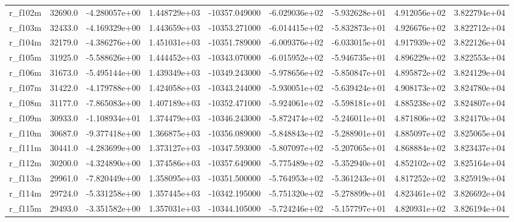 \documentclass[10pt]{article}
\begin{document}
\begin{landscape}
\begin{longtable}{lrrrrrrrr}
r\_f102m                 &   32690.0 & -4.280057e+00 &  1.448729e+03 & -10357.049000 & -6.029036e+02 & -5.932628e+01 &  4.912056e+02 &  3.822794e+04 \\
r\_f103m                 &   32433.0 & -4.169329e+00 &  1.443659e+03 & -10353.271000 & -6.014415e+02 & -5.832873e+01 &  4.926676e+02 &  3.822712e+04 \\
r\_f104m                 &   32179.0 & -4.386276e+00 &  1.451031e+03 & -10351.789000 & -6.009376e+02 & -6.033015e+01 &  4.917939e+02 &  3.822126e+04 \\
r\_f105m                 &   31925.0 & -5.588626e+00 &  1.444452e+03 & -10343.070000 & -6.015952e+02 & -5.946735e+01 &  4.896229e+02 &  3.822553e+04 \\
r\_f106m                 &   31673.0 & -5.495144e+00 &  1.439349e+03 & -10349.243000 & -5.978656e+02 & -5.850847e+01 &  4.895872e+02 &  3.824129e+04 \\
r\_f107m                 &   31422.0 & -4.179788e+00 &  1.424058e+03 & -10343.244000 & -5.930051e+02 & -5.639424e+01 &  4.908173e+02 &  3.824780e+04 \\
r\_f108m                 &   31177.0 & -7.865083e+00 &  1.407189e+03 & -10352.471000 & -5.924061e+02 & -5.598181e+01 &  4.885238e+02 &  3.824807e+04 \\
r\_f109m                 &   30933.0 & -1.108934e+01 &  1.374479e+03 & -10346.243000 & -5.872474e+02 & -5.246011e+01 &  4.871806e+02 &  3.824170e+04 \\
r\_f110m                 &   30687.0 & -9.377418e+00 &  1.366875e+03 & -10356.089000 & -5.848843e+02 & -5.288901e+01 &  4.885097e+02 &  3.825065e+04 \\
r\_f111m                 &   30441.0 & -4.283699e+00 &  1.373127e+03 & -10347.593000 & -5.807097e+02 & -5.207065e+01 &  4.868884e+02 &  3.823437e+04 \\
r\_f112m                 &   30200.0 & -4.324890e+00 &  1.374586e+03 & -10357.649000 & -5.775489e+02 & -5.352940e+01 &  4.852102e+02 &  3.825164e+04 \\
r\_f113m                 &   29961.0 & -7.820449e+00 &  1.358095e+03 & -10351.500000 & -5.764953e+02 & -5.361243e+01 &  4.817252e+02 &  3.825919e+04 \\
r\_f114m                 &   29724.0 & -5.331258e+00 &  1.357445e+03 & -10342.195000 & -5.751320e+02 & -5.278899e+01 &  4.823461e+02 &  3.826692e+04 \\
r\_f115m                 &   29493.0 & -3.351582e+00 &  1.357031e+03 & -10344.105000 & -5.724246e+02 & -5.157797e+01 &  4.820931e+02 &  3.826194e+04 \\

\end{longtable}
\end{landscape}
\end{document}
